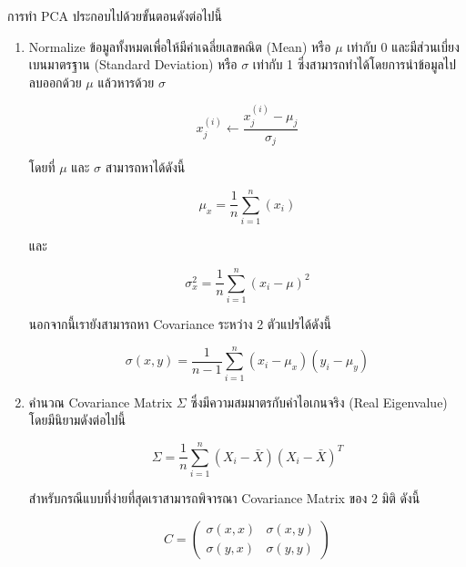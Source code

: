 การทำ PCA ประกอบไปด้วยขั้นตอนดังต่อไปนี้
%
\begin{enumerate}[topsep=0pt,noitemsep]\setlength\itemsep{0.5em}
    \item Normalize ข้อมูลทั้งหมดเพื่อให้มีค่าเฉลี่ยเลขคณิต (Mean) หรือ $\mu$ เท่ากับ 0 และมีส่วนเบี่ยงเบนมาตรฐาน (Standard Deviation) หรือ $\sigma$ เท่ากับ 1 ซึ่งสามารถทำได้โดยการนำข้อมูลไปลบออกด้วย $\mu$ แล้วหารด้วย $\sigma$

          \begin{equation}\label{eq:normalize}
              x^{(i)}_{j} \leftarrow \frac{x^{(i)}_{j} - \mu_{j}}{\sigma_{j}}
          \end{equation}

          \noindent โดยที่ $\mu$ และ $\sigma$ สามารถหาได้ดังนี้

          \begin{equation}\label{eq:mean}
              \mu_{x} = \frac{1}{n} \sum^{n}_{i=1}(x_{i})
          \end{equation}

          \noindent และ

          \begin{equation}\label{eq:variance}
              \sigma^2_{x} = \frac{1}{n} \sum^{n}_{i=1}(x_{i} - \mu)^2
          \end{equation}

          \noindent นอกจากนี้เรายังสามารถหา Covariance ระหว่าง 2 ตัวแปรได้ดังนี้

          \begin{equation}\label{eq:covariance}
              \sigma(x, y) = \frac{1}{n-1} \sum^{n}_{i=1}{(x_i - \mu_{x})(y_i - \mu_{y})}
          \end{equation}

    \item คำนวณ Covariance Matrix $\Sigma$ ซึ่งมีความสมมาตรกับค่าไอเกนจริง (Real Eigenvalue) โดยมีนิยามดังต่อไปนี้

          \begin{equation}
              \Sigma = \frac{1}{n} \sum^{n}_{i=1}{(X_i-\bar{X})(X_i-\bar{X})^T}
          \end{equation}

          \noindent สำหรับกรณีแบบที่ง่ายที่สุดเราสามารถพิจารณา Covariance Matrix ของ 2 มิติ ดังนี้

          \begin{equation}\label{eq:cov_mat_2d}
              C = \left( \begin{array}{ccc}  \sigma(x, x) & \sigma(x, y) \\
             \sigma(y, x)        & \sigma(y, y)\end{array} \right)
          \end{equation}


\end{enumerate}

